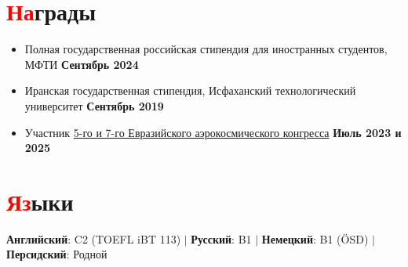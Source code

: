 \documentclass[a4paper, 10pt]{article} %
\newcommand{\resumeItem}[1]{
    \item\small{
        {#1 \vspace{-2pt}}
    }
}
\begin{document}
\section{\textcolor{red}{На}грады}
\begin{itemize}
     \resumeItem{Полная государственная российская стипендия для иностранных студентов, МФТИ} \hfill \textbf{Сентябрь 2024}
    \resumeItem{Иранская государственная стипендия, Исфаханский технологический университет} \hfill \textbf{Сентябрь 2019}
    \resumeItem{Участник \href{https://congress.aero/en/}{5-го и 7-го Евразийского аэрокосмического конгресса}} \hfill \textbf{Июль 2023 и 2025}

\end{itemize}
\vspace{-18pt} %

\section{\textcolor{red}{Яз}ыки}
\begin{center}
    \textbf{Английский}: C2 (TOEFL iBT 113) \quad $|$ \quad 
    \textbf{Русский}: B1 \quad $|$ \quad 
    \textbf{Немецкий}: B1 (ÖSD) \quad $|$ \quad 
    \textbf{Персидский}: Родной
\end{center}
\end{document}
